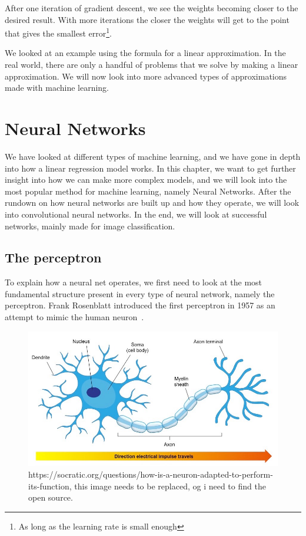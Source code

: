 After one iteration of gradient descent, we see the weights becoming closer to the desired result. With more iterations the closer the weights will get to the point that gives the smallest error\footnote{As long as the learning rate is small enough}. 

 
We looked at an example using the formula for a linear approximation. In the real world, there are only a handful of problems that we solve by making a linear approximation. We will now look into more advanced types of approximations made with machine learning.

    

\section{Neural Networks}
We have looked at different types of machine learning, and we have gone in depth into how a linear regression model works. In this chapter, we want to get further insight into how we can make more complex models, and we will look into the most popular method for machine learning, namely Neural Networks. 
After the rundown on how neural networks are built up and how they operate, we will look into convolutional neural networks. In the end, we will look at successful networks, mainly made for image classification.


\subsection{The perceptron}
\label{cha:perceptron}
To explain how a neural net operates, we first need to look at the most fundamental structure present in every type of neural network, namely the perceptron.
Frank Rosenblatt introduced the first perceptron in 1957 as an attempt to mimic the human neuron~\cite{perceptron}.  


\begin{figure}
        \centering
        \includegraphics[scale=0.5]{background/figures/neuron.jpg}
        \caption{https://socratic.org/questions/how-is-a-neuron-adapted-to-perform-its-function, this image needs to be replaced, og i need to find the open source.}
        \label{fig:neuron}
\end{figure}


